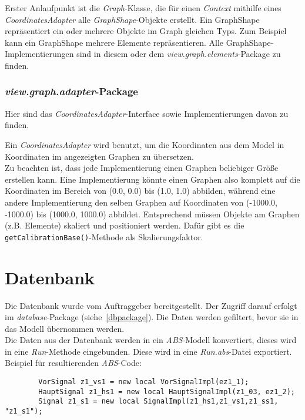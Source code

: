 \documentclass[accentcolor=tud0b,12pt,paper=a4]{tudreport}
\begin{document}
		Erster Anlaufpunkt ist die \textit{Graph}-Klasse, die für einen \textit{Context} mithilfe eines \textit{CoordinatesAdapter} alle \textit{GraphShape}-Objekte erstellt.
		Ein GraphShape repräsentiert ein oder mehrere Objekte im Graph gleichen Typs. Zum Beispiel kann ein GraphShape mehrere Elemente repräsentieren. Alle GraphShape-Implementierungen sind in diesem oder dem \textit{view.graph.elements}-Package zu finden.
		
	\subsection{\textit{view.graph.adapter}-Package}
		Hier sind das \textit{CoordinatesAdapter}-Interface sowie Implementierungen davon zu finden.
		
		Ein \textit{CoordinatesAdapter} wird benutzt, um die Koordinaten aus dem Model in Koordinaten im angezeigten Graphen zu übersetzen.\\
		
		Zu beachten ist, dass jede Implementierung einen Graphen beliebiger Größe erstellen kann. Eine Implementierung könnte einen Graphen also komplett auf die Koordinaten im Bereich von (0.0, 0.0) bis (1.0, 1.0) abbilden, während eine andere Implementierung den selben Graphen auf Koordinaten von (-1000.0, -1000.0) bis (1000.0, 1000.0) abbildet. Entsprechend müssen Objekte am Graphen (z.B. Elemente) skaliert und positioniert werden. Dafür gibt es die \texttt{getCalibrationBase()}-Methode als Skalierungsfaktor.
				
	
	\chapter{Datenbank}
	\label{database}
		Die Datenbank wurde vom Auftraggeber bereitgestellt. Der Zugriff darauf erfolgt im \textit{database}-Package (siehe~\ref{dbpackage}). Die Daten werden gefiltert, bevor sie in das Modell übernommen werden.\\
		Die Daten aus der Datenbank werden in ein \textit{ABS}-Modell konvertiert, dieses wird in eine \textit{Run}-Methode eingebunden. Diese wird in eine \textit{Run.abs}-Datei exportiert.\\
		
		Beispiel für resultierenden \textit{ABS}-Code:\\
		\begin{lstlisting}
		VorSignal z1_vs1 = new local VorSignalImpl(ez1_1);
		HauptSignal z1_hs1 = new local HauptSignalImpl(z1_03, ez1_2);	
		Signal z1_s1 = new local SignalImpl(z1_hs1,z1_vs1,z1_ss1, "z1_s1");
		\end{lstlisting}
\end{document}
